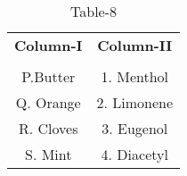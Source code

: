 \begin{table}[htbp]
  \centering
  \caption{Table-8}
  \label{tab:tables/table8.tex}
  \begin{tabular}{cc}
  \textbf{Column-I} & \textbf{Column-II} \\ \\
    P.Butter  & 1. Menthol  \\
    Q. Orange & 2. Limonene \\
    R. Cloves & 3. Eugenol \\
    S. Mint & 4. Diacetyl\\
  \end{tabular}
\end{table}
